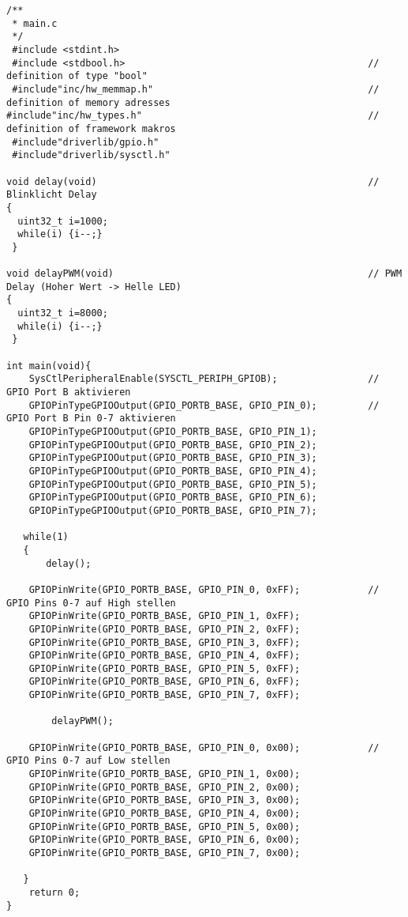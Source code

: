 \begin{lstlisting}
/**
 * main.c
 */
 #include <stdint.h>
 #include <stdbool.h>                                           // definition of type "bool"
 #include"inc/hw_memmap.h"                                      // definition of memory adresses
#include"inc/hw_types.h"                                        // definition of framework makros
 #include"driverlib/gpio.h"
 #include"driverlib/sysctl.h"

void delay(void)                                                // Blinklicht Delay
{
  uint32_t i=1000;                                              
  while(i) {i--;}
 }

void delayPWM(void)                                             // PWM Delay (Hoher Wert -> Helle LED)
{
  uint32_t i=8000;                                            
  while(i) {i--;}
 }

int main(void){
    SysCtlPeripheralEnable(SYSCTL_PERIPH_GPIOB);                // GPIO Port B aktivieren
    GPIOPinTypeGPIOOutput(GPIO_PORTB_BASE, GPIO_PIN_0);         // GPIO Port B Pin 0-7 aktivieren
    GPIOPinTypeGPIOOutput(GPIO_PORTB_BASE, GPIO_PIN_1);
    GPIOPinTypeGPIOOutput(GPIO_PORTB_BASE, GPIO_PIN_2);
    GPIOPinTypeGPIOOutput(GPIO_PORTB_BASE, GPIO_PIN_3);
    GPIOPinTypeGPIOOutput(GPIO_PORTB_BASE, GPIO_PIN_4);
    GPIOPinTypeGPIOOutput(GPIO_PORTB_BASE, GPIO_PIN_5);
    GPIOPinTypeGPIOOutput(GPIO_PORTB_BASE, GPIO_PIN_6);
    GPIOPinTypeGPIOOutput(GPIO_PORTB_BASE, GPIO_PIN_7);

   while(1)
   {
       delay();
       
    GPIOPinWrite(GPIO_PORTB_BASE, GPIO_PIN_0, 0xFF);            // GPIO Pins 0-7 auf High stellen
    GPIOPinWrite(GPIO_PORTB_BASE, GPIO_PIN_1, 0xFF);
    GPIOPinWrite(GPIO_PORTB_BASE, GPIO_PIN_2, 0xFF);
    GPIOPinWrite(GPIO_PORTB_BASE, GPIO_PIN_3, 0xFF);
    GPIOPinWrite(GPIO_PORTB_BASE, GPIO_PIN_4, 0xFF);
    GPIOPinWrite(GPIO_PORTB_BASE, GPIO_PIN_5, 0xFF);
    GPIOPinWrite(GPIO_PORTB_BASE, GPIO_PIN_6, 0xFF);
    GPIOPinWrite(GPIO_PORTB_BASE, GPIO_PIN_7, 0xFF);
    
        delayPWM();
        
    GPIOPinWrite(GPIO_PORTB_BASE, GPIO_PIN_0, 0x00);            // GPIO Pins 0-7 auf Low stellen
    GPIOPinWrite(GPIO_PORTB_BASE, GPIO_PIN_1, 0x00);
    GPIOPinWrite(GPIO_PORTB_BASE, GPIO_PIN_2, 0x00);
    GPIOPinWrite(GPIO_PORTB_BASE, GPIO_PIN_3, 0x00);
    GPIOPinWrite(GPIO_PORTB_BASE, GPIO_PIN_4, 0x00);
    GPIOPinWrite(GPIO_PORTB_BASE, GPIO_PIN_5, 0x00);
    GPIOPinWrite(GPIO_PORTB_BASE, GPIO_PIN_6, 0x00);
    GPIOPinWrite(GPIO_PORTB_BASE, GPIO_PIN_7, 0x00);

   }
    return 0;
}
\end{lstlisting}